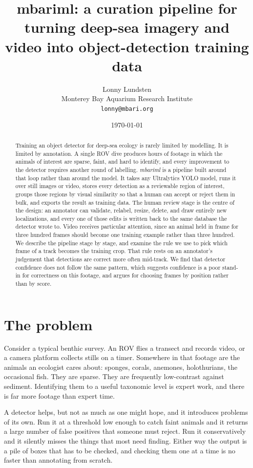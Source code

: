 \documentclass[10pt,letterpaper]{article}
\title{\vspace{-2em}\bfseries mbariml: a curation pipeline for turning deep-sea
imagery and video into object-detection training data}
\author{Lonny Lundsten\\[2pt]
\normalsize Monterey Bay Aquarium Research Institute\\
\normalsize \texttt{lonny@mbari.org}}
\date{\normalsize\today}
\begin{document}
\maketitle

\begin{abstract}
\noindent
Training an object detector for deep-sea ecology is rarely limited by modelling.
It is limited by annotation. A single ROV dive produces hours of footage in which
the animals of interest are sparse, faint, and hard to identify, and every
improvement to the detector requires another round of labelling. \emph{mbariml}
is a pipeline built around that loop rather than around the model. It takes any
Ultralytics YOLO model, runs it over still images or video, stores every
detection as a reviewable region of interest, groups those regions by visual
similarity so that a human can accept or reject them in bulk, and exports the
result as training data. The human review stage is the centre of the design: an
annotator can validate, relabel, resize, delete, and draw entirely new
localizations, and every one of those edits is written back to the same database
the detector wrote to. Video receives particular attention, since an animal held
in frame for three hundred frames should become one training example rather than
three hundred. We describe the pipeline stage by stage, and examine the rule we
use to pick which frame of a track becomes the training crop. That rule rests on
an annotator's judgement that detections are correct more often mid-track. We
find that detector confidence does not follow the same pattern, which suggests
confidence is a poor stand-in for correctness on this footage, and argues for
choosing frames by position rather than by score.
\end{abstract}

\section{The problem}

Consider a typical benthic survey. An ROV flies a transect and records video, or
a camera platform collects stills on a timer. Somewhere in that footage are the
animals an ecologist cares about: sponges, corals, anemones, holothurians, the
occasional fish. They are sparse. They are frequently low-contrast against
sediment. Identifying them to a useful taxonomic level is expert work, and there
is far more footage than expert time.

A detector helps, but not as much as one might hope, and it introduces problems
of its own. Run it at a threshold low enough to catch faint animals and it
returns a large number of false positives that someone must reject. Run it
conservatively and it silently misses the things that most need finding. Either
way the output is a pile of boxes that has to be checked, and checking them one
at a time is no faster than annotating from scratch.
\end{document}
